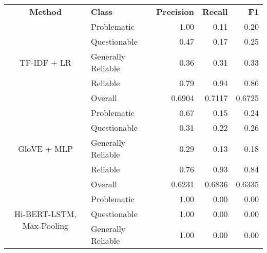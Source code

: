 \begin{table}[htbp]
    \centering
    \scriptsize
    \begin{longtable}{| c | l | r | r | r |}
        \hline                            \textbf{Method}     & \textbf{Class}     & \textbf{Precision} & \textbf{Recall} & \textbf{F1} \\\cline{1-5}
        \multirow{5}{*}{TF-IDF + LR}                          & Problematic        & 1.00               & 0.11            & 0.20        \\
                                                              & Questionable       & 0.47               & 0.17            & 0.25        \\
                                                              & Generally Reliable & 0.36               & 0.31            & 0.33        \\
                                                              & Reliable           & 0.79               & 0.94            & 0.86        \\\cline{2-5}
                                                              & Overall            & 0.6904             & 0.7117          & 0.6725      \\
        \hline
        \multirow{5}{*}{GloVE + MLP}                          & Problematic        & 0.67               & 0.15            & 0.24        \\
                                                              & Questionable       & 0.31               & 0.22            & 0.26        \\
                                                              & Generally Reliable & 0.29               & 0.13            & 0.18        \\
                                                              & Reliable           & 0.76               & 0.93            & 0.84        \\\cline{2-5}
                                                              & Overall            & 0.6231             & 0.6836          & 0.6335      \\
        \hline
        \multirow{5}{*}{Hi-BERT-LSTM, Max-Pooling}            & Problematic        & 1.00               & 0.00            & 0.00        \\
                                                              & Questionable       & 1.00               & 0.00            & 0.00        \\
                                                              & Generally Reliable & 1.00               & 0.00            & 0.00        \\

\end{longtable}
\end{table}
